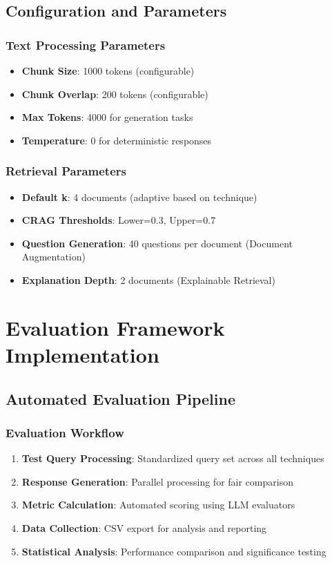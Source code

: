 \documentclass[12pt,a4paper]{article}
\begin{document}
\begin{itemize}
\subsection{Configuration and Parameters}

\subsubsection{Text Processing Parameters}
\begin{itemize}
    \item \textbf{Chunk Size}: 1000 tokens (configurable)
    \item \textbf{Chunk Overlap}: 200 tokens (configurable)
    \item \textbf{Max Tokens}: 4000 for generation tasks
    \item \textbf{Temperature}: 0 for deterministic responses
\end{itemize}

\subsubsection{Retrieval Parameters}
\begin{itemize}
    \item \textbf{Default k}: 4 documents (adaptive based on technique)
    \item \textbf{CRAG Thresholds}: Lower=0.3, Upper=0.7
    \item \textbf{Question Generation}: 40 questions per document (Document Augmentation)
    \item \textbf{Explanation Depth}: 2 documents (Explainable Retrieval)
\end{itemize}

\section{Evaluation Framework Implementation}

\subsection{Automated Evaluation Pipeline}

\subsubsection{Evaluation Workflow}
\begin{enumerate}
    \item \textbf{Test Query Processing}: Standardized query set across all techniques
    \item \textbf{Response Generation}: Parallel processing for fair comparison
    \item \textbf{Metric Calculation}: Automated scoring using LLM evaluators
    \item \textbf{Data Collection}: CSV export for analysis and reporting
    \item \textbf{Statistical Analysis}: Performance comparison and significance testing
\end{enumerate}


\end{itemize}
\end{document}
